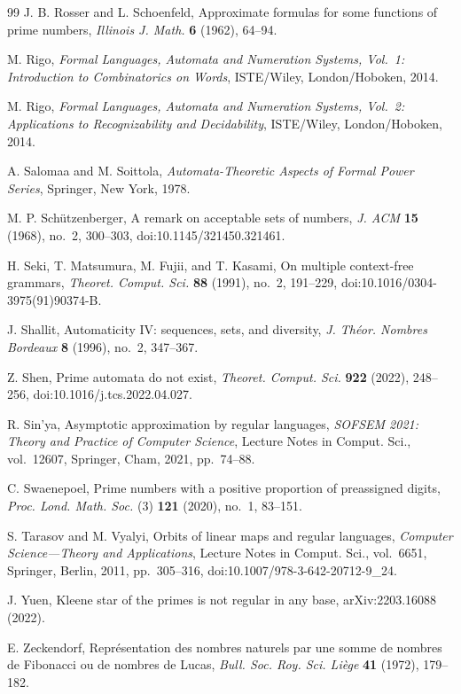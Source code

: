 \begin{thebibliography}{99}
J. B. Rosser and L. Schoenfeld,
Approximate formulas for some functions of prime numbers,
\textit{Illinois J. Math.} \textbf{6} (1962), 64--94.

M. Rigo,
\textit{Formal Languages, Automata and Numeration Systems, Vol.~1:
Introduction to Combinatorics on Words},
ISTE/Wiley, London/Hoboken, 2014.

M. Rigo,
\textit{Formal Languages, Automata and Numeration Systems, Vol.~2:
Applications to Recognizability and Decidability},
ISTE/Wiley, London/Hoboken, 2014.

A. Salomaa and M. Soittola,
\textit{Automata-Theoretic Aspects of Formal Power Series},
Springer, New York, 1978.

M. P. Sch\"utzenberger,
A remark on acceptable sets of numbers,
\textit{J. ACM} \textbf{15} (1968), no.~2, 300--303,
doi:10.1145/321450.321461.

H. Seki, T. Matsumura, M. Fujii, and T. Kasami,
On multiple context-free grammars,
\textit{Theoret. Comput. Sci.} \textbf{88} (1991), no.~2, 191--229,
doi:10.1016/0304-3975(91)90374-B.

J. Shallit,
Automaticity IV: sequences, sets, and diversity,
\textit{J. Th\'eor. Nombres Bordeaux} \textbf{8} (1996), no.~2,
347--367.

Z. Shen,
Prime automata do not exist,
\textit{Theoret. Comput. Sci.} \textbf{922} (2022), 248--256,
doi:10.1016/j.tcs.2022.04.027.

R. Sin'ya,
Asymptotic approximation by regular languages,
\textit{SOFSEM 2021: Theory and Practice of Computer Science},
Lecture Notes in Comput. Sci., vol.~12607, Springer, Cham, 2021,
pp.~74--88.

C. Swaenepoel,
Prime numbers with a positive proportion of preassigned digits,
\textit{Proc. Lond. Math. Soc.} (3) \textbf{121} (2020), no.~1, 83--151.

S. Tarasov and M. Vyalyi,
Orbits of linear maps and regular languages,
\textit{Computer Science---Theory and Applications}, Lecture Notes in
Comput. Sci., vol.~6651, Springer, Berlin, 2011, pp.~305--316,
doi:10.1007/978-3-642-20712-9\_24.

J. Yuen,
Kleene star of the primes is not regular in any base,
arXiv:2203.16088 (2022).

E. Zeckendorf,
Repr{\'e}sentation des nombres naturels par une somme de nombres de
Fibonacci ou de nombres de Lucas,
\textit{Bull. Soc. Roy. Sci. Li{\`e}ge} \textbf{41} (1972), 179--182.

\end{thebibliography}
